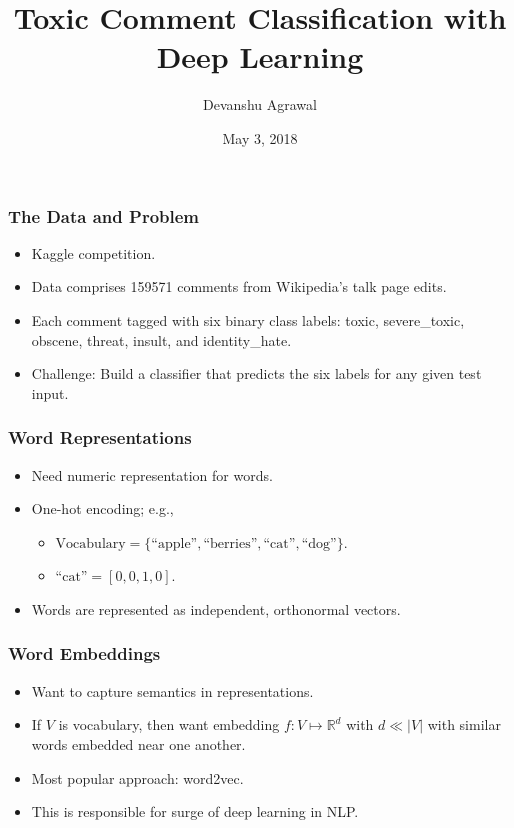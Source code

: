 \documentclass{beamer}
\title{Toxic Comment Classification with Deep Learning}
\author{Devanshu Agrawal}
\date{May 3, 2018}
\begin{document}
\begin{frame}
\titlepage
\end{frame}

\begin{frame}
\frametitle{The Data and Problem}
\begin{itemize}
\item Kaggle competition.
\item Data comprises 159571 comments from Wikipedia's talk page edits.
\item Each comment tagged with six binary class labels: toxic, severe\_toxic, obscene, threat, insult, and identity\_hate.
\item Challenge: Build a classifier that predicts the six labels for any given test input.
\end{itemize}
\end{frame}

\begin{frame}
\frametitle{Word Representations}
\begin{itemize}
\item Need numeric representation for words.
\item One-hot encoding; e.g.,
\begin{itemize}
\item $\mbox{Vocabulary} = \{\mbox{``apple''}, \mbox{``berries''}, \mbox{``cat''}, \mbox{``dog''}\}$.
\item $\mbox{``cat''} = [0, 0, 1, 0]$.
\end{itemize}
\item Words are represented as independent, orthonormal vectors.
\end{itemize}
\end{frame}

\begin{frame}
\frametitle{Word Embeddings}
\begin{itemize}
\item Want to capture semantics in representations.
\item If $V$ is vocabulary, then want embedding $f:V\mapsto \mathbb{R}^d$ with $d \ll |V|$ with similar words embedded near one another.
\item Most popular approach: word2vec.
\item This is responsible for surge of deep learning in NLP.
\end{itemize}
\end{frame}
\end{document}
